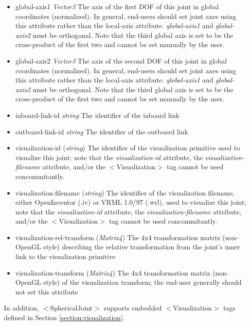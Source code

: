 \documentclass{article}
\begin{document}
\begin{landscape}
\begin{itemize}
\begin{itemize}
\item global-axis1  \emph{Vector3} The axis of the first DOF of this joint in global coordinates (normalized).  In general, end-users should set joint axes using this attribute rather than the local-axis attribute.  \emph{global-axis1} and \emph{global-axis2} must be orthogonal.  Note that the third global axis is set to be the cross-product of the first two and cannot be set manually by the user.
\item global-axis2  \emph{Vector3} The axis of the second DOF of this joint in global coordinates (normalized).  In general, end-users should set joint axes using this attribute rather than the local-axis attribute.  \emph{global-axis1} and \emph{global-axis2} must be orthogonal.  Note that the third global axis is set to be the cross-product of the first two and cannot be set manually by the user.
\item inboard-link-id  \emph{string} The identifier of the inboard link
\item outboard-link-id  \emph{string} The identifier of the outboard link
\item visualization-id (\emph{string})  The identifier of the visualization primitive used to visualize this joint; note that the \emph{visualization-id} attribute, the \emph{visualization-filename} attribute, and/or the $<$Visualization$>$ tag cannot be used concommitantly.
\item visualization-filename (\emph{string})  The identifier of the visualization filename, either OpenInventor (.iv) or VRML 1.0/97 (.wrl), used to visualize this joint; note that the \emph{visualization-id} attribute, the \emph{visualization-filename} attribute, and/or the $<$Visualization$>$ tag cannot be used concommitantly.
\item visualization-rel-transform (\emph{Matrix4})  The 4x4 transformation matrix (non-OpenGL style) describing the relative transformation from the joint's inner link to the visualization primitive
\item visualization-transform (\emph{Matrix4})  The 4x4 transformation matrix (non-OpenGL style) of the visualization transform; the end-user generally should not set this attribute
\end{itemize}

In addition, $<$SphericalJoint$>$ supports embedded $<$Visualization$>$ tags defined in Section \ref{section:visualization}.



\end{itemize}
\end{landscape}
\end{document}
